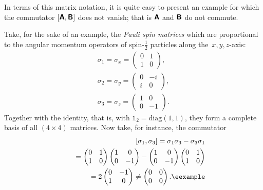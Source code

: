 {\color{blue}
\bexample
In terms of this matrix notation, it is quite easy to present an example
for which the commutator
$
[\textsf{\textbf{A}}, \textsf{\textbf{B}} ]
$
does not vanish; that is
$\textsf{\textbf{A}}$  and $\textsf{\textbf{B}}$
do not commute.

Take, for the sake of an example, the
{\em Pauli spin matrices}
which are proportional to the angular momentum operators
of spin-$\frac{1}{2}$ particles
along the~$x,y,z$-axis:
\begin{equation}
\begin{split}
\sigma_1=\sigma_x
=
\begin{pmatrix}
0&1\\
1&0
\end{pmatrix}
,   \\
\sigma_2=\sigma_y
=
\begin{pmatrix}
0&-i\\
i&0
\end{pmatrix}
,   \\
\sigma_3=\sigma_z
=
\begin{pmatrix}
1&0\\
0&-1
\end{pmatrix}
.
\end{split}
\label{2019-mm-ch-fdvs-psm}
\end{equation}
Together with the identity, that is, with $\mathbb{1}_2=\textrm{diag}(1,1)$,
they form a complete basis of all $(4\times 4)$ matrices.
Now take, for instance, the commutator
\begin{equation}
\begin{split}
[\sigma_1,\sigma_3]= \sigma_1\sigma_3-\sigma_3\sigma_1\\
\qquad
=
\begin{pmatrix}
0&1\\
1&0
\end{pmatrix}
\begin{pmatrix}
1&0\\
0&-1
\end{pmatrix}
-
\begin{pmatrix}
1&0\\
0&-1
\end{pmatrix}
\begin{pmatrix}
0&1\\
1&0
\end{pmatrix}
\\
\qquad
=  2
\begin{pmatrix}
0&-1\\
1&0
\end{pmatrix}
\neq
\begin{pmatrix}
0&0\\
0&0
\end{pmatrix}
.    \textrm{\eexample}
\end{split}
\end{equation}
}


